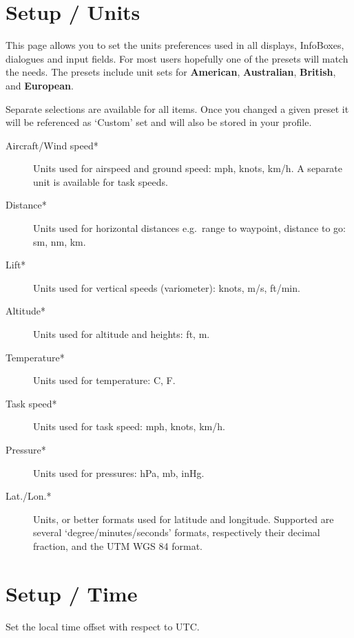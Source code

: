 \section{Setup / Units}

This page allows you to set the units preferences used in all
displays, InfoBoxes, dialogues and input fields.  
For most users hopefully one of the presets will match the needs.  The presets 
include unit sets for {\bf American}, {\bf Australian}, {\bf British}, 
and {\bf European}.

Separate selections are available for all items. Once you changed a given preset it 
will be referenced as `Custom' set and will also be stored in your profile.

\begin{description}
\item[Aircraft/Wind speed*]  Units used for airspeed and ground speed: mph, 
  knots, km/h. A separate unit is available for task speeds.
\item[Distance*]  Units used for horizontal distances e.g.\ range to waypoint,
  distance to go: sm, nm, km.
\item[Lift*]  Units used for vertical speeds (variometer): knots, m/s, ft/min.
\item[Altitude*] Units used for altitude and heights: ft, m.
\item[Temperature*]  Units used for temperature: \degree C, \degree F.
\item[Task speed*] Units used for task speed: mph, knots, km/h.
\item[Pressure*]  Units used for pressures: hPa, mb, inHg.
\item[Lat./Lon.*]  Units, or better formats used for latitude and longitude. 
  Supported are several `degree/minutes/seconds' formats, respectively 
  their decimal fraction, and the  UTM WGS 84 format.
\end{description}


\section{Setup / Time}

Set the local time offset with respect to UTC.

